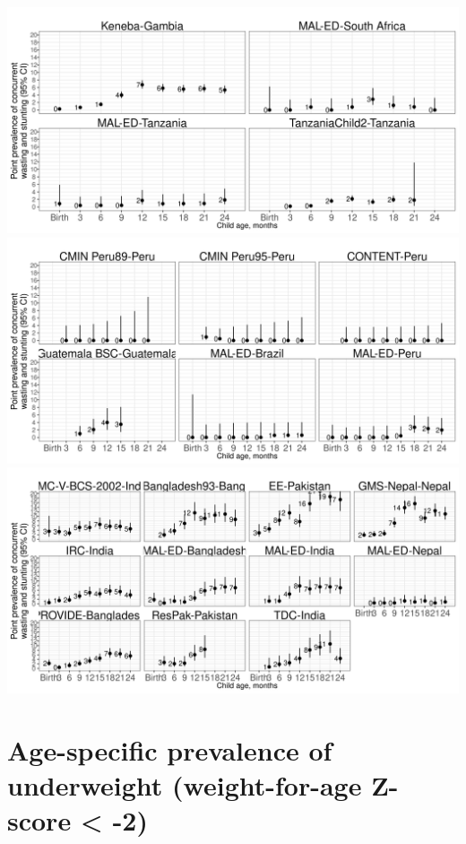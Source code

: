 \documentclass[
  9pt,
]{book}
\begin{document}
\includegraphics[width=41.67in]{figures//wasting/fig-co_plot_africa}
\includegraphics[width=41.67in]{figures//wasting/fig-co_plot_lam}
\includegraphics[width=41.67in]{figures//wasting/fig-co_plot_sasia}

\hypertarget{age-specific-prevalence-of-underweight-weight-for-age-z-score--2}{%
\section{Age-specific prevalence of underweight (weight-for-age Z-score \textless{} -2)}\label{age-specific-prevalence-of-underweight-weight-for-age-z-score--2}}
\end{document}
